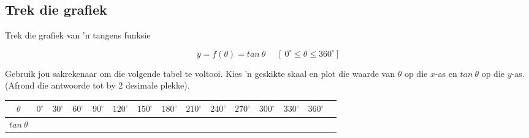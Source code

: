 \subsection*{Trek die grafiek}
\begin{wex}
{Trek die grafiek van ’n tangens funksie
}
{
\begin{equation*}
 y=f(\theta)=tan ~\theta~~~~~~[~0^{\circ} \leq \theta \leq 360^{\circ}]
\end{equation*}

Gebruik jou sakrekenaar om die volgende tabel te voltooi.
Kies ’n geskikte skaal en plot die waarde van
 $\theta $ op die $x$-as en $tan ~\theta$ op die $y$-as. (Afrond die
antwoorde tot by $2$ desimale plekke).


\begin{table}[H]
\begin{tabular}{|c|m{0.3cm}|m{0.4cm}|m{0.4cm}|m{0.4cm}|m{0.5cm}|m{0.5cm}|m{0.5cm}|m{0.5cm}|m{0.5cm}|m{0.5cm}|m{0.5cm}|m{0.5cm}|m{0.5cm}|} \hline

\footnotesize$\theta $&
\footnotesize$0^{\circ }$&
\footnotesize$30^{\circ }$&
\footnotesize$60^{\circ }$&
\footnotesize$90^{\circ }$&
\footnotesize$120^{\circ }$&
\footnotesize$150^{\circ }$&
\footnotesize$180^{\circ }$&
\footnotesize$210^{\circ }$&
\footnotesize$240^{\circ }$&
\footnotesize$270^{\circ }$&
\footnotesize$300^{\circ }$&
\footnotesize$330^{\circ }$&
\footnotesize$360^{\circ }$
\\ \hline

\footnotesize$tan ~\theta $&
&
&
&
&
&
&
&
&
&
&
&
&
&

 \hline
\end{tabular}


\end{table}}
\end{wex}
